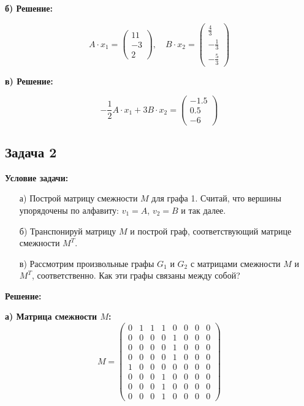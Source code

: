 \documentclass[a4paper,12pt]{article}
\begin{document}
\textbf{б) Решение:}
\begin{itemize}
   \[
   A \cdot x_1 = \begin{pmatrix} 11 \\ -3 \\ 2 \end{pmatrix}, \quad B \cdot x_2 = \begin{pmatrix} \frac{4}{3} \\ -\frac{1}{3} \\ -\frac{5}{3} \end{pmatrix}
   \]
\end{itemize}

\textbf{в) Решение:}
\begin{itemize}
   \[
   -\frac{1}{2} A \cdot x_1 + 3 B \cdot x_2 = \begin{pmatrix} -1.5 \\ 0.5 \\ -6 \end{pmatrix}
   \]
\end{itemize}



\subsection{Задача 2}
\textbf{Условие задачи:}
\begin{itemize}
    \item[а)] Построй матрицу смежности \( M \) для графа 1. Считай, что вершины упорядочены по алфавиту: \( v_1 = A \), \( v_2 = B \) и так далее.
    \item[б)] Транспонируй матрицу \( M \) и построй граф, соответствующий матрице смежности \( M^T \).
    \item[в)] Рассмотрим произвольные графы \( G_1 \) и \( G_2 \) с матрицами смежности \( M \) и \( M^T \), соответственно. Как эти графы связаны между собой?
\end{itemize}

\textbf{Решение:}

\textbf{а) Матрица смежности \( M \):}
\[
M = \begin{pmatrix}
0 & 1 & 1 & 1 & 0 & 0 & 0 & 0 \\
0 & 0 & 0 & 0 & 1 & 0 & 0 & 0 \\
0 & 0 & 0 & 0 & 1 & 0 & 0 & 0 \\
0 & 0 & 0 & 0 & 1 & 0 & 0 & 0 \\
1 & 0 & 0 & 0 & 0 & 0 & 0 & 0 \\
0 & 0 & 0 & 1 & 0 & 0 & 0 & 0 \\
0 & 0 & 0 & 1 & 0 & 0 & 0 & 0 \\
0 & 0 & 0 & 1 & 0 & 0 & 0 & 0
\end{pmatrix}
\]
\end{document}

